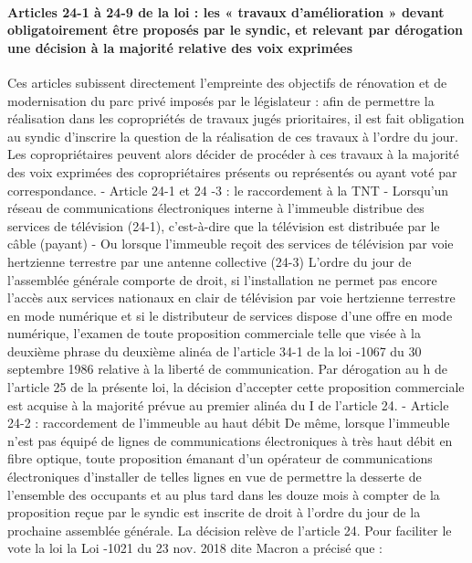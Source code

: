 			\paragraph{Articles 24-1 à 24-9 de la loi : les « travaux d’amélioration » devant obligatoirement être proposés par le syndic, et relevant par dérogation une décision à la majorité relative des voix exprimées}
			
				Ces articles subissent directement l’empreinte des objectifs de rénovation et de modernisation du parc privé imposés par le législateur : afin de permettre la réalisation dans les copropriétés de travaux jugés prioritaires, il est fait obligation au syndic d’inscrire la question de la réalisation de ces travaux à l’ordre du jour. Les copropriétaires peuvent alors décider de procéder à ces travaux à la majorité des voix exprimées des copropriétaires présents ou représentés ou ayant voté par correspondance.
				- Article 24-1 et 24 -3 : le raccordement à la TNT
				- Lorsqu'un réseau de communications électroniques interne à l'immeuble distribue des services de télévision (24-1), c’est-à-dire que la télévision est distribuée par le câble (payant)
				- Ou lorsque l'immeuble reçoit des services de télévision par voie hertzienne terrestre par une antenne collective (24-3)
				L'ordre du jour de l'assemblée générale comporte de droit, si l'installation ne permet pas encore l'accès aux services nationaux en clair de télévision par voie hertzienne terrestre en mode numérique et si le distributeur de services dispose d'une offre en mode numérique, l'examen de toute proposition commerciale telle que visée à la deuxième phrase du deuxième alinéa de l'article 34-1 de la loi -1067 du 30 septembre 1986 relative à la liberté de communication.
				Par dérogation au h de l'article 25 de la présente loi, la décision d'accepter cette proposition commerciale est acquise à la majorité prévue au premier alinéa du I de l'article 24.
				- Article 24-2 : raccordement de l’immeuble au haut débit
				De même, lorsque l'immeuble n'est pas équipé de lignes de communications électroniques à très haut débit en fibre optique, toute proposition émanant d'un opérateur de communications électroniques d'installer de telles lignes en vue de permettre la desserte de l'ensemble des occupants et au plus tard dans les douze mois à compter de la proposition reçue par le syndic est inscrite de droit à l'ordre du jour de la prochaine assemblée générale. La décision relève de l’article 24.
				Pour faciliter le vote la loi la Loi -1021 du 23 nov. 2018 dite Macron a précisé que :
